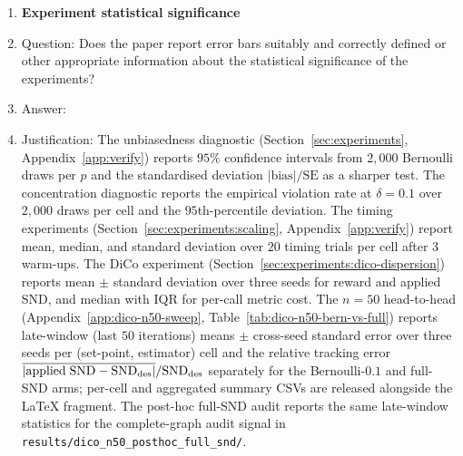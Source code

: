 \begin{enumerate}
\item {\bf Experiment statistical significance}
    \item[] Question: Does the paper report error bars suitably and correctly defined or other appropriate information about the statistical significance of the experiments?
    \item[] Answer: \answerYes{}
    \item[] Justification: The unbiasedness diagnostic
    (Section~\ref{sec:experiments}, Appendix~\ref{app:verify})
    reports $95\%$ confidence intervals from $2{,}000$ Bernoulli draws
    per $p$ and the standardised deviation
    $|\mathrm{bias}|/\mathrm{SE}$ as a sharper test. The concentration
    diagnostic reports the empirical violation rate at $\delta{=}0.1$
    over $2{,}000$ draws per cell and the $95$th-percentile deviation.
    The timing experiments
    (Section~\ref{sec:experiments:scaling},
    Appendix~\ref{app:verify}) report mean, median, and standard
    deviation over $20$ timing trials per cell after $3$ warm-ups.
    The DiCo experiment (Section~\ref{sec:experiments:dico-dispersion})
    reports mean $\pm$ standard deviation over three seeds for reward
    and applied SND, and median with IQR for per-call metric cost.
    The $n{=}50$ head-to-head (Appendix~\ref{app:dico-n50-sweep},
    Table~\ref{tab:dico-n50-bern-vs-full}) reports late-window (last
    $50$ iterations) means $\pm$ cross-seed standard error over three
    seeds per (set-point, estimator) cell and the relative tracking
    error
    $\overline{|\mathrm{applied}\;\mathrm{SND}-\mathrm{SND}_{\mathrm{des}}|}/
    \mathrm{SND}_{\mathrm{des}}$ separately for the Bernoulli-$0.1$ and
    full-SND arms; per-cell and aggregated summary CSVs are
    released alongside the LaTeX fragment. The post-hoc full-SND audit
    reports the same late-window statistics for the complete-graph
    audit signal in
    \texttt{results/dico\_n50\_posthoc\_full\_snd/}.


\end{enumerate}
